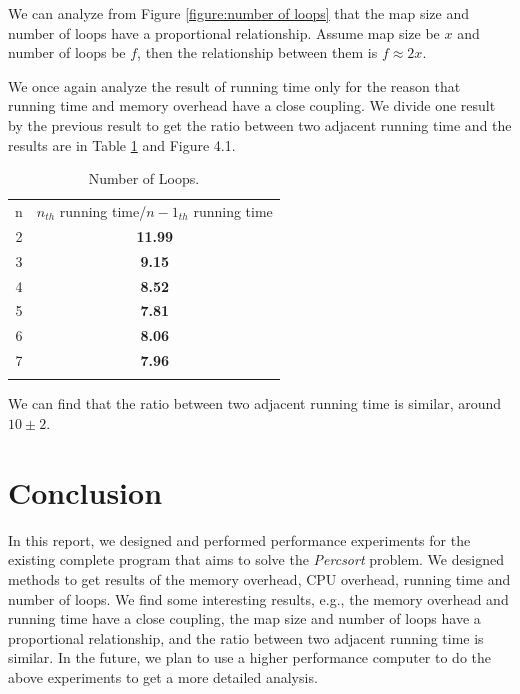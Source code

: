 \documentclass{article}
\begin{document}
We can analyze from Figure \ref{figure:number of loops} that the map size and number of loops have a proportional relationship. Assume map size be $x$ and number of loops be $f$, then the relationship between them is $f\approx 2x$.

We once again analyze the result of running time only for the reason that running time and memory overhead have a close coupling. We divide one result by the previous result to get the ratio between two adjacent running time and the results are in Table \ref{table:ratio} and Figure 4.1.

\begin{table}[H]
\scriptsize
\centering
\label{table:ratio}
\begin{tabular}{c|c}%
\hline\noalign{\smallskip}
n & $n_{th}$ running time/$n-1_{th}$ running time\\
\noalign{\smallskip}\hline\noalign{\smallskip}
2 & \textbf{11.99}\\
3 & \textbf{9.15}\\
4 & \textbf{8.52}\\
5 & \textbf{7.81}\\
6 & \textbf{8.06}\\
7 & \textbf{7.96}\\
\noalign{\smallskip}\hline
\end{tabular}
\caption{Number of Loops.}
\end{table}


We can find that the ratio between two adjacent running time is similar, around $10\pm2$.

\section{Conclusion}
In this report, we designed and performed performance experiments for the existing complete program that aims to solve the \emph{Percsort} problem. We designed methods to get results of the memory overhead, CPU overhead, running time and number of loops. We find some interesting results, e.g., the memory overhead and running time have a close coupling, the map size and number of loops have a proportional relationship, and the ratio between two adjacent running time is similar. In the future, we plan to use a higher performance computer to do the above experiments to get a more detailed analysis.
\end{document}

